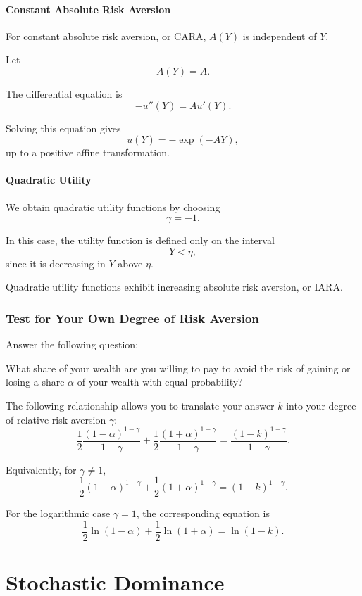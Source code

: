 \paragraph{Constant Absolute Risk Aversion}

For constant absolute risk aversion, or CARA, \(A(Y)\) is independent of \(Y\).

Let
\[
A(Y)=A.
\]

The differential equation is
\[
-u''(Y)=A u'(Y).
\]

Solving this equation gives
\[
u(Y)
=
-\exp(-AY),
\]
up to a positive affine transformation.

\paragraph{Quadratic Utility}

We obtain quadratic utility functions by choosing
\[
\gamma=-1.
\]

In this case, the utility function is defined only on the interval
\[
Y<\eta,
\]
since it is decreasing in \(Y\) above \(\eta\).

Quadratic utility functions exhibit increasing absolute risk aversion, or IARA.

\subsubsection{Test for Your Own Degree of Risk Aversion}

Answer the following question:

What share of your wealth are you willing to pay to avoid the risk of gaining or losing a share \(\alpha\) of your wealth with equal probability?

The following relationship allows you to translate your answer \(k\) into your degree of relative risk aversion \(\gamma\):
\[
\frac{1}{2}
\frac{(1-\alpha)^{1-\gamma}}{1-\gamma}
+
\frac{1}{2}
\frac{(1+\alpha)^{1-\gamma}}{1-\gamma}
=
\frac{(1-k)^{1-\gamma}}{1-\gamma}.
\]

Equivalently, for \(\gamma\ne 1\),
\[
\frac{1}{2}(1-\alpha)^{1-\gamma}
+
\frac{1}{2}(1+\alpha)^{1-\gamma}
=
(1-k)^{1-\gamma}.
\]

For the logarithmic case \(\gamma=1\), the corresponding equation is
\[
\frac{1}{2}\ln(1-\alpha)
+
\frac{1}{2}\ln(1+\alpha)
=
\ln(1-k).
\]

\section{Stochastic Dominance}


